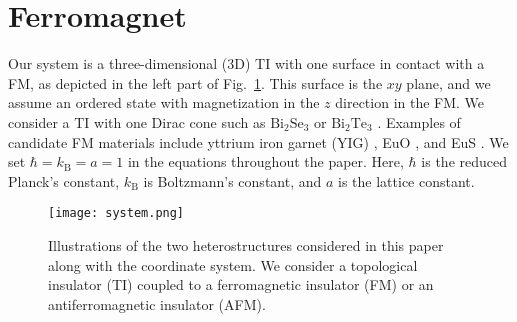 \documentclass[aps, prb, twocolumn,amsmath,amssymb,floatfix]{revtex4-2}
\begin{document}
\section{Ferromagnet} \label{sec:FM}

Our system is a three-dimensional (3D) TI with one surface in contact with a FM, as depicted in the left part of Fig.~\ref{fig:system}. This surface is the $xy$ plane, and we assume an ordered state with magnetization in the $z$ direction in the FM. We consider a TI with one Dirac cone such as $\textrm{Bi}_2\textrm{Se}_3$ or $\textrm{Bi}_2\textrm{Te}_3$ \cite{NatureTIzhang}. Examples of candidate FM materials include yttrium iron garnet (YIG) \cite{ExpFMYIG}, EuO \cite{ExpFMEuO, FMNMFMArnePRB}, and EuS \cite{TIFMexp}. We set $\hbar = k_{\textrm{B}} = a = 1$ in the equations throughout the paper. Here, $\hbar$ is the reduced Planck's constant, $k_{\textrm{B}}$ is Boltzmann's constant, and $a$ is the lattice constant. 

\begin{figure}
    \centering
    \texttt{[image: system.png]}
    \caption{Illustrations of the two heterostructures considered in this paper along with the coordinate system. We consider a topological insulator (TI) coupled to a ferromagnetic insulator (FM) or an antiferromagnetic insulator (AFM).}
    \label{fig:system}
\end{figure}
\end{document}
